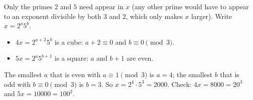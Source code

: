 Only the primes $2$ and $5$ need appear in $x$ (any other prime would have to appear to an exponent divisible by both $3$ and $2$, which only makes $x$ larger). Write $x=2^a5^b$.
\begin{itemize}
\item $4x=2^{a+2}5^b$ is a cube: $a+2\equiv0$ and $b\equiv0\pmod3$.
\item $5x=2^a5^{b+1}$ is a square: $a$ and $b+1$ are even.
\end{itemize}
The smallest $a$ that is even with $a\equiv1\pmod3$ is $a=4$; the smallest $b$ that is odd with $b\equiv0\pmod3$ is $b=3$. So $x=2^4\cdot5^3=\boxed{2000}$. Check: $4x=8000=20^3$ and $5x=10000=100^2$.
